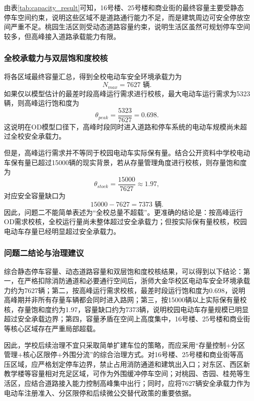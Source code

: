 \documentclass[UTF8,zihao=-4,a4paper]{ctexart}
\begin{document}
由表\ref{tab:capacity_result}可知，16号楼、25号楼和商业街的最终容量主要受静态停车空间约束，说明这些区域不是道路通行能力不足，而是建筑周边可安全停放空间严重不足。桃园生活区则受动态道路容量约束，说明生活区虽然可规划停车空间较多，但高峰接入道路承载能力有限。

\subsubsection{全校承载力与双层饱和度校核}

将各区域最终容量汇总，得到全校电动车安全环境承载力为
\begin{equation}
N_{max}=7627\text{ 辆}.
\end{equation}
如果仅以模型估计的最差时段高峰运行需求进行校核，最大电动车运行需求为5323辆，则高峰运行饱和度为
\begin{equation}
\theta_{peak}=\frac{5323}{7627}=0.698.
\end{equation}
这说明在OD模型口径下，高峰时段同时进入道路和停车系统的电动车规模尚未超过全校安全承载力。

但是，高峰运行需求并不等同于校园电动车实际保有量。结合公开资料中学校电动车保有量已超过15000辆的现实背景，若从存量管理角度进行校核，则存量饱和度为
\begin{equation}
\theta_{stock}=\frac{15000}{7627}\approx 1.97,
\end{equation}
对应安全容量缺口为
\begin{equation}
15000-7627=7373\text{ 辆}.
\end{equation}
因此，问题二不能简单表述为“全校总量不超载”。更准确的结论是：按高峰运行OD需求校核，全校运行量尚未整体超过安全承载力；但按实际保有量校核，校园电动车存量已经明显超过安全承载力。

\subsubsection{问题二结论与治理建议}

综合静态停车容量、动态道路容量和双层饱和度校核结果，可以得到以下结论：第一，在严格扣除消防通道和必要通行空间后，浙师大金华校区电动车安全环境承载力约为7627辆；第二，按高峰运行需求校核，最差时段运行饱和度为0.698，说明高峰期并非所有存量车辆都会同时进入路网；第三，按15000辆以上实际保有量校核，存量饱和度约为1.97，容量缺口约为7373辆，说明校园电动车存量规模已明显超过安全承载边界；第四，容量矛盾在空间上高度集中，16号楼、25号楼和商业街等核心区域存在严重局部超载。

因此，学校后续治理不宜只采取简单扩建车位的策略，而应采用“存量控制+分区管理+核心区限停+外围分流”的综合治理方式。对16号楼、25号楼和商业街等高压区域，应严格划定停车边界，禁止占用消防通道和建筑出入口；对东区、西区新教学楼等容量相对充足区域，可作为外围缓冲停车空间；对桃园、杏园、桂苑等生活区，应结合道路接入能力控制高峰集中出行；同时，应将7627辆安全承载力作为电动车注册准入、分区限停和后续微公交替代政策的重要依据。
\end{document}
